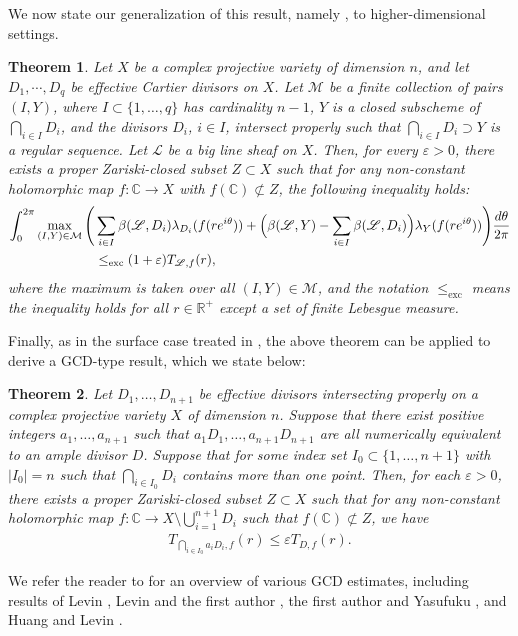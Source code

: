 \documentclass[10pt]{amsart}
\numberwithin{equation}{section}
\theoremstyle{plain}
\newtheorem{theorem}{Theorem}[section]
\theoremstyle{definition}
\begin{document}
We now state our generalization of this result, namely \cite[Theorem~1.4]{HLX}, to higher-dimensional settings.
 
 
 \begin{theorem}\label{trungeneral}
    Let $X$ be a complex projective variety of dimension $n$, and let $D_1,\cdots,D_q$  be effective Cartier divisors on  $X$.
  Let $\mathcal M$ be a finite collection of pairs $(I,Y)$, where 
$I \subset \{1,\ldots,q\}$ has cardinality $n-1$, $Y$ is a closed subscheme of $\bigcap_{i \in I} D_i$, and the divisors $D_i$, $i \in I$, intersect properly  such that $ \bigcap_{i \in I} D_i\supset Y $
is a  regular sequence. Let $\mathscr L$ be a big line sheaf on $X$.  
 Then, for every $\varepsilon>0$,  there exists a proper  Zariski-closed subset $Z\subset X$ such that for any non-constant holomorphic map $f:\mathbb{C}\to X$ with  $f(\mathbb{C})\not\subset Z$,  the following  inequality  holds:
 \begin{align}\label{mainineq}
\int_0^{2\pi} \max_{(I,Y) \in \mathcal{M}} \Bigg(
&\sum_{i \in I} \beta(\mathscr{L}, D_i)\lambda_{D_i}(f(re^{i\theta}))  
 + \Big( \beta(\mathscr{L}, Y) - \sum_{i \in I} \beta(\mathscr{L}, D_i) \Big) \lambda_Y(f(re^{i\theta}))
\Bigg)   \frac{d\theta}{2\pi}\notag\\
&\leq_{\operatorname{exc}} (1+\varepsilon) T_{\mathscr{L}, f}(r),
\end{align}
where the maximum is taken over all   $(I,Y)\in\mathcal M$, and the notation $\leq_{\operatorname{exc}}$ means the inequality holds for all $r\in \mathbb{R}^+$ except a set of finite Lebesgue measure.
\end{theorem}



Finally, as in the surface case treated in \cite{HLX}, the above theorem can be applied to derive a GCD-type result, which we state below:
\begin{theorem}\label{MainThmgcd}
Let $D_1, \ldots,D_{n+1}$ be effective  divisors intersecting properly on a complex projective variety $X$ of dimension $n$. Suppose that there exist positive integers $a_1,\ldots, a_{n+1}$ such that $a_1D_1, \ldots, a_{n+1}D_{n+1}$ are all numerically equivalent to an ample divisor $D$.  
Suppose that for some index set $I_0 \subset \{1,\ldots,n+1\}$ with $|I_0|=n$ such that $\bigcap_{i\in I_0}D_i$ contains more than one point. 
Then, for  each $\varepsilon>0$,   there exists a proper  Zariski-closed subset $Z\subset X$ such that for any non-constant holomorphic map $f:\mathbb{C}\to X\setminus{\bigcup_{i=1}^{n+1} } D_i$ such that  $f(\mathbb{C})\not\subset Z$,  we have 
\begin{align*}
T_{ \bigcap_{i \in I_0}a_iD_i, f}(r) 
        \le \varepsilon  T_{D,f}(r). 
\end{align*}
\end{theorem}
We refer the reader to \cite{HLX} for an overview of various GCD estimates, including results of Levin \cite{LevinGCD}, Levin and the first author \cite{LW}, the first author and Yasufuku \cite{WY}, and Huang and Levin \cite{HL}.
\end{document}
